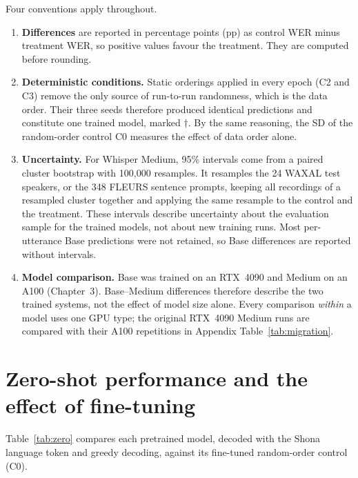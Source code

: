 \documentclass[12pt,a4paper]{report}
\begin{document}
Four conventions apply throughout.
\begin{enumerate}
\item \textbf{Differences} are reported in percentage points (pp) as control WER
minus treatment WER, so positive values favour the treatment. They are computed
before rounding.
\item \textbf{Deterministic conditions.} Static orderings applied in every epoch
(C2 and C3) remove the only source of run-to-run randomness, which is the data
order. Their three seeds therefore produced identical predictions and constitute
one trained model, marked $\dagger$. By the same reasoning, the SD of the
random-order control C0 measures the effect of data order alone.
\item \textbf{Uncertainty.} For Whisper Medium, 95\% intervals come from a paired
cluster bootstrap with 100{,}000 resamples. It resamples the 24 WAXAL test
speakers, or the 348 FLEURS sentence prompts, keeping all recordings of a
resampled cluster together and applying the same resample to the control and the
treatment. These intervals describe uncertainty about the evaluation sample for
the trained models, not about new training runs. Most per-utterance Base
predictions were not retained, so Base differences are reported without
intervals.
\item \textbf{Model comparison.} Base was trained on an RTX~4090 and Medium on an
A100 (Chapter~3). Base--Medium differences therefore describe the two trained
systems, not the effect of model size alone. Every comparison \emph{within} a
model uses one GPU type; the original RTX~4090 Medium runs are compared with
their A100 repetitions in Appendix Table~\ref{tab:migration}.
\end{enumerate}

\section{Zero-shot performance and the effect of fine-tuning}
\label{sec:zero}

Table~\ref{tab:zero} compares each pretrained model, decoded with the Shona
language token and greedy decoding, against its fine-tuned random-order
control (C0).
\end{document}
